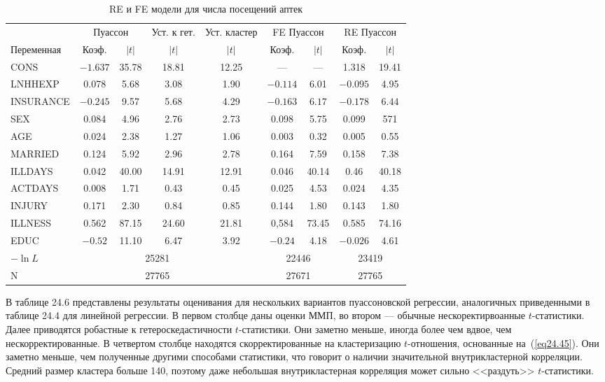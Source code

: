 \begin{table}[h]
\caption{\label{tab:farmacyfere} RE и FE модели для числа посещений аптек}
\begin{center}
\begin{tabular}{ p{2.5cm} cc cc cc cc}
\hline
 & \multicolumn{2}{c}{Пуассон} & Уст. к гет. & Уст. кластер & \multicolumn{2}{c}{FE Пуассон} & \multicolumn{2}{c}{RE Пуассон}\\
\cmidrule(r){2-3} \cmidrule(r){4-4} \cmidrule(r){5-5} \cmidrule(r){6-7} \cmidrule(r){8-9}
Переменная & Коэф. & $|t|$ & $|t|$ & $|t|$ & Коэф. & $|t|$ & Коэф. & $|t|$ \\
\hline
CONS & $-1.637$ & 35.78 & 18.81 & 12.25 & ---  & --- & 1.318 & 19.41 \\
LNHHEXP & 0.078 & 5.68 & 3.08 & 1.90 & $-0.114$ & 6.01 & $-0.095$ & 4.95 \\
INSURANCE & $-0.245$ & 9.57 & 5.68 & 4.29 & $-0.163$ & $6.17$ & $-0.178$ & $6.44$ \\
SEX & 0.084 & 4.96 & 2.76 & 2.73 & 0.098 & 5.75 & 0.099 & 571 \\
AGE & 0.024 & 2.38 & 1.27 & 1.06 & 0.003 & 0.32 & 0.005 & 0.55 \\
MARRIED & 0.124 & 5.92 & 2.96 & 2.78 & 0.164 & 7.59 & 0.158 & 7.38 \\
ILLDAYS & 0.042 & 40.00 & 14.91 & 12.91 & 0.046 & 40.14 & 0.46 & 40.18 \\
ACTDAYS & 0.008 & 1.71 & 0.43 & 0.45 & 0.025 & 4.53 & 0.024 & 4.35 \\
INJURY & 0.171 & 2.30 & 0.84 & 0.85 & 0.144 & 1.80 & 0.143 & 1.80 \\
ILLNESS & 0.562 & 87.15 & 24.60 & 21.81 & 0,584 & 73.45 & 0.585 & 74.16 \\
EDUC & $-0.52$ & 11.10 & 6.47 & 3.92 & $-0.24$ & 4.18 & $-0.026$ & 4.61\\
$-\ln L$ & & \multicolumn{2}{c}{25281} &  & \multicolumn{2}{c}{22446} & \multicolumn{2}{c}{23419} \\
N & & \multicolumn{2}{c}{27765} & & \multicolumn{2}{c}{27671} & \multicolumn{2}{c}{27765} \\
\hline
\hline
\end{tabular}
\end{center}
\end{table}


В таблице 24.6 представлены результаты оценивания для нескольких вариантов пуассоновской регрессии, аналогичных приведенными в таблице 24.4 для линейной регрессии. В первом столбце даны оценки ММП, во втором --- обычные нескоректирвоанные $t$-статистики. Далее приводятся робастные к гетероскедастичности $t$-статистики. Они заметно меньше, иногда более чем вдвое, чем нескорректированные. В четвертом столбце находятся скорректированные на кластеризацию $t$-отношения, основанные на~(\ref{eq24.45}). Они заметно меньше, чем полученные другими способами статистики, что говорит о наличии значительной внутрикластерной корреляции. Средний размер кластера больше 140, поэтому даже небольшая внутрикластерная корреляция может сильно <<раздуть>> $t$-статистики. 

